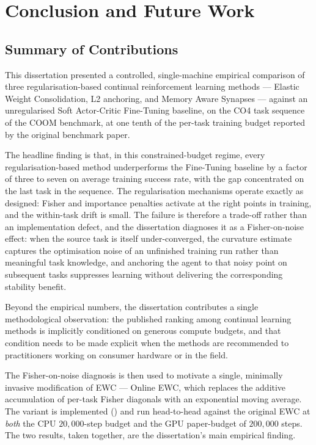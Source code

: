 \chapter{Conclusion and Future Work}
\label{ch:concl}

\section{Summary of Contributions}

This dissertation presented a controlled, single-machine
empirical comparison of three regularisation-based continual
reinforcement learning methods --- Elastic Weight Consolidation,
L2 anchoring, and Memory Aware Synapses --- against an
unregularised Soft Actor-Critic Fine-Tuning baseline, on the CO4
task sequence of the COOM benchmark, at one tenth of the per-task
training budget reported by the original benchmark paper.

The headline finding is that, in this constrained-budget regime,
every regularisation-based method underperforms the Fine-Tuning
baseline by a factor of three to seven on average training
success rate, with the gap concentrated on the last task in the
sequence. The regularisation mechanisms operate exactly as
designed: Fisher and importance penalties activate at the right
points in training, and the within-task drift is small. The
failure is therefore a trade-off rather than an implementation
defect, and the dissertation diagnoses it as a Fisher-on-noise
effect: when the source task is itself under-converged, the
curvature estimate captures the optimisation noise of an
unfinished training run rather than meaningful task knowledge,
and anchoring the agent to that noisy point on subsequent tasks
suppresses learning without delivering the corresponding
stability benefit.

Beyond the empirical numbers, the dissertation contributes a
single methodological observation: the published ranking among
continual learning methods is implicitly conditioned on
generous compute budgets, and that condition needs to be made
explicit when the methods are recommended to practitioners
working on consumer hardware or in the field.

The Fisher-on-noise diagnosis is then used to motivate a
single, minimally invasive modification of EWC --- Online
EWC, which replaces the additive accumulation of per-task
Fisher diagonals with an exponential moving average. The
variant is implemented () and run
head-to-head against the original EWC at \emph{both} the
CPU $20{,}000$-step budget and the GPU paper-budget of
$200{,}000$ steps. The two results, taken together, are
the dissertation's main empirical finding.

